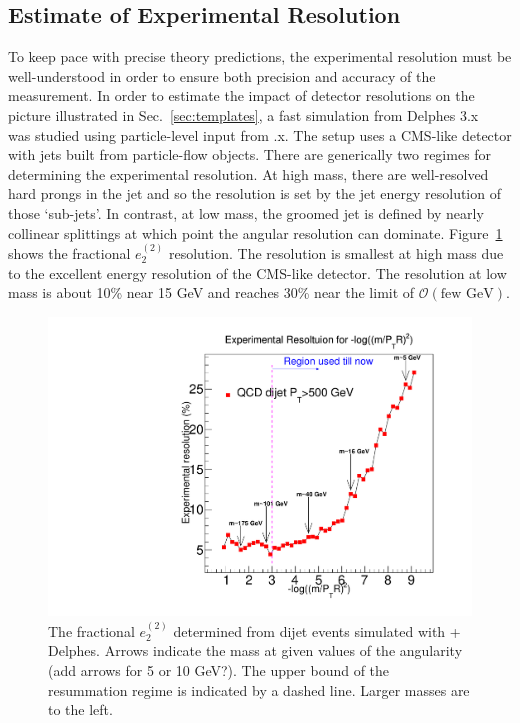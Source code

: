\subsection{Estimate of Experimental Resolution}
\label{sec:resolution}

To keep pace with precise theory predictions, the experimental
resolution must be well-understood in order to ensure both precision
and accuracy of the measurement.  In order to estimate the impact of
detector resolutions on the picture illustrated in
Sec.~\ref{sec:templates}, a fast simulation from Delphes
3.x~\cite{deFavereau:2013fsa} was studied using particle-level input
from \pythia.x.  The setup uses a CMS-like detector with jets built from
particle-flow objects.  There are generically two regimes for
determining the experimental resolution.  At high mass, there are
well-resolved hard prongs in the jet and so the resolution is set by
the jet energy resolution of those `sub-jets'.  In contrast, at low
mass, the groomed jet is defined by nearly collinear splittings at
which point the angular resolution can dominate.
Figure~\ref{fig:resolution} shows the fractional $e_2^{(2)}$
resolution.  The resolution is smallest at high mass due to the excellent energy resolution of the CMS-like detector.  The
resolution at low mass is about 10\% near 15 GeV and reaches 30\% near
the limit of $\mathcal{O}(\text{few GeV})$.

\begin{figure}[h!]
\begin{center}
\includegraphics[width = 0.49\columnwidth]{figures/experimentaldemo/Resolution_plot_logrho_updated.pdf}
\end{center}
\caption{The fractional $e_2^{(2)}$ determined from dijet events simulated with \pythia + Delphes.  Arrows indicate the mass at given values of the angularity (add arrows for 5 or 10 GeV?).  The upper bound of the resummation regime is indicated by a dashed line.  Larger masses are to the left.}
\label{fig:resolution}
\end{figure}

